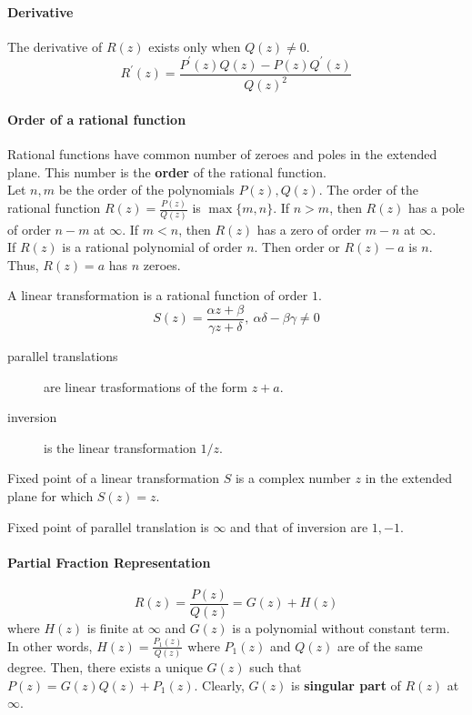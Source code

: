 \paragraph{Derivative}
The derivative of $R(z)$ exists only when $Q(z) \ne 0$.
\[ R^\prime(z) = \frac{P^\prime(z)Q(z) - P(z)Q^\prime(z)}{Q(z)^2} \]

\paragraph{Order of a rational function}
Rational functions have common number of zeroes and poles in the extended plane.
This number is the \textbf{order} of the rational function.\\

Let $n,m$ be the order of the polynomials $P(z),Q(z)$.
The order of the rational function $R(z) = \frac{P(z)}{Q(z)}$ is $\max\{m,n\}$.
If $n > m$, then $R(z)$ has a pole of order $n-m$ at $\infty$.
If $m < n$, then $R(z)$ has a zero of order $m-n$ at $\infty$.\\

If $R(z)$ is a rational polynomial of order $n$.
Then order or $R(z)-a$ is $n$.
Thus, $R(z)=a$ has $n$ zeroes.
\begin{definition}
	A linear transformation is a rational function of order $1$.
	\[ S(z) = \frac{\alpha z + \beta}{\gamma z + \delta} ,\ \alpha\delta - \beta\gamma \ne 0 \]
\end{definition}
\begin{description}
	\item[parallel translations] are linear trasformations of the form $z+a$.
	\item[inversion] is the linear transformation $1/z$.
\end{description}

\begin{definition}
	Fixed point of a linear transformation $S$ is a complex number $z$ in the extended plane for which $S(z) = z$.
\end{definition}
Fixed point of parallel translation is $\infty$ and that of inversion are $1,-1$.

\paragraph{Partial Fraction Representation}
\[ R(z) = \frac{P(z)}{Q(z)} = G(z) + H(z) \]
where $H(z)$ is finite at $\infty$ and $G(z)$ is a polynomial without constant term.
In other words, $H(z) = \frac{P_1(z)}{Q(z)}$ where $P_1(z)$ and $Q(z)$ are of the same degree.
Then, there exists a unique $G(z)$ such that $P(z) = G(z)Q(z) + P_1(z)$.
Clearly, $G(z)$ is \textbf{singular part} of $R(z)$ at $\infty$.\\


